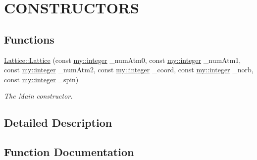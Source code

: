 \hypertarget{group__CONSTRUCTORS}{}\section{C\+O\+N\+S\+T\+R\+U\+C\+T\+O\+RS}
\label{group__CONSTRUCTORS}
\subsection*{Functions}
\begin{DoxyCompactItemize}
\item 
\hyperlink{group__CONSTRUCTORS_ga00f110e740c797ff92d3e589f58bd051}{Lattice\+::\+Lattice} (const \hyperlink{namespacemy_a42365393c537edae1e89d20ff90d1923}{my\+::integer} \+\_\+num\+Atm0, const \hyperlink{namespacemy_a42365393c537edae1e89d20ff90d1923}{my\+::integer} \+\_\+num\+Atm1, const \hyperlink{namespacemy_a42365393c537edae1e89d20ff90d1923}{my\+::integer} \+\_\+num\+Atm2, const \hyperlink{namespacemy_a42365393c537edae1e89d20ff90d1923}{my\+::integer} \+\_\+coord, const \hyperlink{namespacemy_a42365393c537edae1e89d20ff90d1923}{my\+::integer} \+\_\+norb, const \hyperlink{namespacemy_a42365393c537edae1e89d20ff90d1923}{my\+::integer} \+\_\+spin)
\begin{DoxyCompactList}\small\item\em The Main constructor. \end{DoxyCompactList}\end{DoxyCompactItemize}


\subsection{Detailed Description}


\subsection{Function Documentation}
